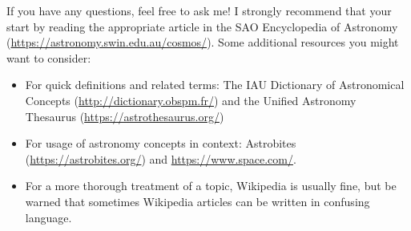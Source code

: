 \documentclass[11pt]{article}
\begin{document}
If you have any questions, feel free to ask me! I strongly recommend that your start by reading the appropriate article in the SAO Encyclopedia of Astronomy (\url{https://astronomy.swin.edu.au/cosmos/}). Some additional resources you might want to consider:
\begin{itemize}
    \item For quick definitions and related terms: The IAU Dictionary of Astronomical Concepts (\url{http://dictionary.obspm.fr/}) and the Unified Astronomy Thesaurus (\url{https://astrothesaurus.org/})   
    
    \item For usage of astronomy concepts in context: Astrobites (\url{https://astrobites.org/}) and \url{https://www.space.com/}.
    
    \item For a more thorough treatment of a topic, Wikipedia is usually fine, but be warned that sometimes Wikipedia articles can be written in confusing language.
\end{itemize}
\end{document}
